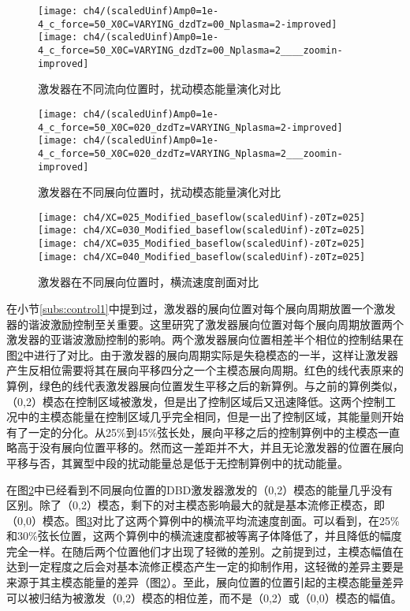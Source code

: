 \begin{figure}
\centering
\texttt{[image: ch4/(scaledUinf)Amp0=1e-4\_c\_force=50\_X0C=VARYING\_dzdTz=00\_Nplasma=2-improved]}
\texttt{[image: ch4/(scaledUinf)Amp0=1e-4\_c\_force=50\_X0C=VARYING\_dzdTz=00\_Nplasma=2\_\_\_\_zoomin-improved]}
\caption{激发器在不同流向位置时，扰动模态能量演化对比}%
\label{f:streamwiselocationeffect}
\end{figure}
\begin{figure}
\centering
\texttt{[image: ch4/(scaledUinf)Amp0=1e-4\_c\_force=50\_X0C=020\_dzdTz=VARYING\_Nplasma=2-improved]}
\texttt{[image: ch4/(scaledUinf)Amp0=1e-4\_c\_force=50\_X0C=020\_dzdTz=VARYING\_Nplasma=2\_\_\_zoomin-improved]}
\caption{激发器在不同展向位置时，扰动模态能量演化对比}%
\label{f:spanwiselocationeffect}
\end{figure}
\begin{figure}
\centering
\texttt{[image: ch4/XC=025\_Modified\_baseflow(scaledUinf)-z0Tz=025]}
\texttt{[image: ch4/XC=030\_Modified\_baseflow(scaledUinf)-z0Tz=025]}
\texttt{[image: ch4/XC=035\_Modified\_baseflow(scaledUinf)-z0Tz=025]}
\texttt{[image: ch4/XC=040\_Modified\_baseflow(scaledUinf)-z0Tz=025]}
\caption{激发器在不同展向位置时，横流速度剖面对比}%
\label{f:Wt_SpVar}
\end{figure}

在小节\ref{subs:control1}中提到过，激发器的展向位置对每个展向周期放置一个激发器的谐波激励控制至关重要。这里研究了激发器展向位置对每个展向周期放置两个激发器的亚谐波激励控制的影响。两个激发器展向位置相差半个相位的控制结果在图\ref{f:spanwiselocationeffect}中进行了对比。由于激发器的展向周期实际是失稳模态的一半，这样让激发器产生反相位需要将其在展向平移四分之一个主模态展向周期。红色的线代表原来的算例，绿色的线代表激发器展向位置发生平移之后的新算例。与之前的算例类似，（0,2）模态在控制区域被激发，但是出了控制区域后又迅速降低。这两个控制工况中的主模态能量在控制区域几乎完全相同，但是一出了控制区域，其能量则开始有了一定的分化。从25\%到45\%弦长处，展向平移之后的控制算例中的主模态一直略高于没有展向位置平移的。然而这一差距并不大，并且无论激发器的位置在展向平移与否，其翼型中段的扰动能量总是低于无控制算例中的扰动能量。

在图\ref{f:spanwiselocationeffect}中已经看到不同展向位置的DBD激发器激发的（0,2）模态的能量几乎没有区别。除了（0,2）模态，剩下的对主模态影响最大的就是基本流修正模态，即（0,0）模态。图\ref{f:Wt_SpVar}对比了这两个算例中的横流平均流速度剖面。可以看到，在25\%和30\%弦长位置，这两个算例中的横流速度都被等离子体降低了，并且降低的幅度完全一样。在随后两个位置他们才出现了轻微的差别。之前提到过，主模态幅值在达到一定程度之后会对基本流修正模态产生一定的抑制作用，这轻微的差异主要是来源于其主模态能量的差异（图\ref{f:spanwiselocationeffect}）。至此，展向位置的位置引起的主模态能量差异可以被归结为被激发（0,2）模态的相位差，而不是（0,2）或（0,0）模态的幅值。

